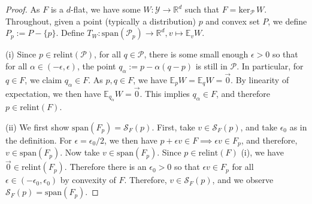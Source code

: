 \documentclass[anon,12pt]{colt2021} %
\newcommand{\Comments}{1}
\newcommand{\mynote}[2]{\ifnum\Comments=1\textcolor{#1}{#2}\fi}
\newcommand{\mytodo}[2]{\ifnum\Comments=1%
	\todo[linecolor=#1!80!black,backgroundcolor=#1,bordercolor=#1!80!black]{#2}\fi}
\newcommand{\raf}[1]{\mynote{green}{[RF: #1]}}
\newcommand{\raft}[1]{\mytodo{green!20!white}{RF: #1}}
\newcommand{\reals}{\mathbb{R}}
\newcommand{\relint}[1]{\mathrm{relint}(#1)}
\newcommand{\spn}{\mathrm{span}}
\newcommand{\zeros}[1]{\mathrm{ker}_\P\,#1}
\newcommand{\E}{\mathbb{E}}
\renewcommand{\P}{\mathcal{P}}
\newcommand{\Scr}{\mathcal{S}}  %
\newcommand{\Y}{\mathcal{Y}}
\begin{document}
\begin{proof}
  
  As $F$ is a $d$-flat, we have some $W:\Y \to \reals^d$ such that $F = \zeros{W}$.
  Throughout, given a point (typically a distribution) $p$ and convex set $P$, we define $P_p := P - \{p\}$.
  Define $T_W:\spn(\P_p)\to\reals^d, v\mapsto \E_v W$.
  
  (i)
  Since $p \in \relint{\P}$, for all $q \in \P$, there is some small enough $\epsilon > 0 $ so that for all $\alpha \in (-\epsilon,\epsilon)$, the point $q_\alpha := p - \alpha(q - p)$ is still in $\P$.
  In particular, for $q \in F$, we claim $q_\alpha \in F$.
  As $p,q \in F$, we have $\E_pW = \E_qW = \vec 0$.
  By linearity of expectation, we then have $\E_{q_\alpha} W = \vec 0$.
  This implies $q_\alpha \in F$, and therefore $p \in \relint{F}$.
  
  (ii)
  We first show $\spn(F_p) = \Scr_F(p)$.
  First, take $v \in \Scr_F(p)$, and take $\epsilon_0$ as in the definition.
  For $\epsilon = \epsilon_0 / 2$, we then have $p + \epsilon v \in F \implies \epsilon v \in F_p$, and therefore, $v \in \spn(F_p)$.  
  Now take $v \in \spn(F_p)$.
  Since $p \in \relint{F}$ (i), we have $\vec 0 \in \relint{F_p}$.
  Therefore there is an $\epsilon_0 > 0$ so that $\epsilon v \in F_p$ for all $\epsilon \in (-\epsilon_0, \epsilon_0)$ by convexity of $F$.
  Therefore, $v \in \Scr_F(p)$, and we observe $\Scr_F(p) = \spn(F_p)$.
  

\end{proof}
\end{document}
